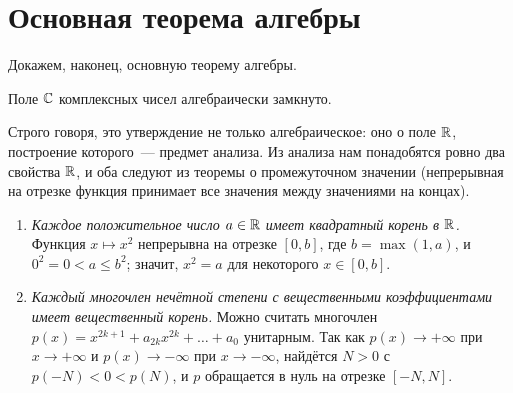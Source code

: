 \makeatletter
{}
\makeatother
\section{Основная теорема алгебры}

Докажем, наконец, основную теорему алгебры.

\begin{theorem}[5.6]
Поле $\mathbb C$ комплексных чисел алгебраически замкнуто.
\end{theorem}

Строго говоря, это утверждение не только алгебраическое: оно о поле $\mathbb R$, построение которого~--- предмет анализа.
Из анализа нам понадобятся ровно два свойства $\mathbb R$, и оба следуют из теоремы о промежуточном значении (непрерывная на
отрезке функция принимает все значения между значениями на концах).

\begin{enumerate}[label=(\roman*),leftmargin=*]
\item \emph{Каждое положительное число $a\in\mathbb R$ имеет квадратный корень в $\mathbb R$.} Функция $x\mapsto x^2$ непрерывна на
отрезке $[0,b]$, где $b=\max(1,a)$, и $0^2=0<a\le b^2$; значит, $x^2=a$ для некоторого $x\in[0,b]$.
\item \emph{Каждый многочлен нечётной степени с вещественными коэффициентами имеет вещественный корень.} Можно считать
многочлен $p(x)=x^{2k+1}+a_{2k}x^{2k}+\dots+a_0$ унитарным. Так как $p(x)\to+\infty$ при $x\to+\infty$ и $p(x)\to-\infty$
при $x\to-\infty$, найдётся $N>0$ с $p(-N)<0<p(N)$, и $p$ обращается в нуль на отрезке $[-N,N]$.
\end{enumerate}

